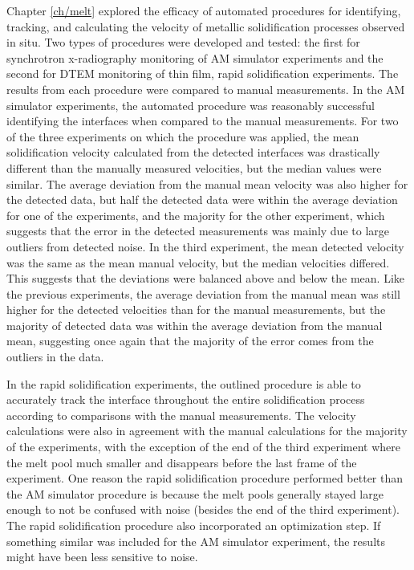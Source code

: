 Chapter \ref{ch/melt} explored the efficacy of automated procedures for
identifying, tracking, and calculating the velocity of metallic solidification
processes observed in situ. Two types of procedures were developed and tested:
the first for synchrotron x-radiography monitoring of AM
simulator experiments and the second for DTEM monitoring of thin film,
rapid solidification experiments.
The results from each procedure were compared to manual measurements. In the
AM simulator experiments, the automated procedure was reasonably successful
identifying the interfaces when compared to the manual measurements.
For two of the three experiments on which the procedure was applied, the
mean solidification velocity calculated from the detected interfaces
was drastically different than the manually measured velocities,
but the median values were similar. The average deviation from the manual
mean velocity was also higher for the detected data, but half the detected
data were within the average deviation for one of the experiments, and the
majority for the other experiment, which suggests that the error
in the detected measurements was mainly due to large outliers from
detected noise. In the third experiment, the mean detected velocity
was the same as the mean manual velocity, but the median velocities
differed. This suggests that the deviations were balanced above and below
the mean. Like the previous experiments, the average deviation from the
manual mean was still higher for the detected velocities than for the
manual measurements, but the majority of detected data was within the
average deviation from the manual mean, suggesting once again that the
majority of the error comes from the outliers in the data.

In the rapid solidification experiments, the outlined procedure is able
to accurately track the interface throughout the entire solidification
process according to comparisons with the manual measurements. The velocity
calculations were also in agreement with the manual calculations for the
majority of the experiments, with the exception of the end of the third
experiment where the melt pool much smaller and disappears before the last
frame of the experiment. One reason the rapid solidification procedure
performed better than the AM simulator procedure is because the melt pools
generally stayed large enough to not be confused with noise (besides the
end of the third experiment). The rapid solidification procedure also
incorporated an optimization step. If something similar was included for
the AM simulator experiment, the results might have been less sensitive
to noise.

